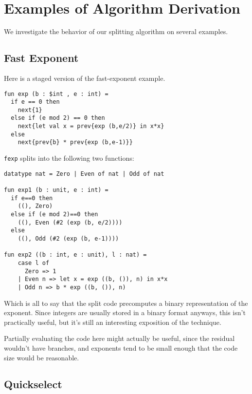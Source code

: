 
\section{Examples of Algorithm Derivation}
\label{sec:examples}

We investigate the behavior of our splitting algorithm on several examples.

\subsection{Fast Exponent}

Here is a staged version of the fast-exponent example.
\begin{lstlisting} 
fun exp (b : $int , e : int) = 
  if e == 0 then 
    next{1} 
  else if (e mod 2) == 0 then
    next{let val x = prev{exp (b,e/2)} in x*x} 
  else 
    next{prev{b} * prev{exp (b,e-1)}}
\end{lstlisting}

\noindent
{\tt fexp} splits into the following two functions:

\begin{lstlisting} 
datatype nat = Zero | Even of nat | Odd of nat

fun exp1 (b : unit, e : int) =
  if e==0 then
    ((), Zero)
  else if (e mod 2)==0 then 
    ((), Even (#2 (exp (b, e/2))))
  else 
    ((), Odd (#2 (exp (b, e-1))))

fun exp2 ((b : int, e : unit), l : nat) = 
    case l of
      Zero => 1
    | Even n => let x = exp ((b, ()), n) in x*x 
    | Odd n => b * exp ((b, ()), n)
\end{lstlisting}

Which is all to say that the split code precomputes a binary representation of the exponent.
Since integers are usually stored in a binary format anyways, this isn't practically useful,
but it's still an interesting exposition of the technique.

Partially evaluating the code here might actually be useful, since the residual wouldn't have branches,
and exponents tend to be small enough that the code size would be reasonable.

\subsection{Quickselect}



